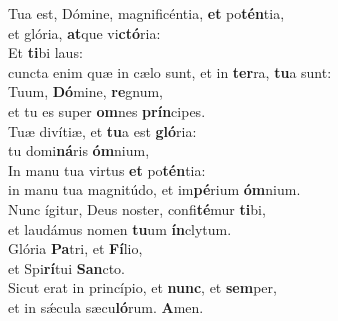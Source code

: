\evenverse Tua est, Dómine, magnificéntia, \textbf{et} po\textbf{tén}tia,~\*\\
\evenverse et glória, \textbf{at}que vi\textbf{ctó}ria:\\
\oddverse Et \textbf{ti}bi laus:~\*\\
\oddverse cuncta enim quæ in cælo sunt, et in \textbf{ter}ra, \textbf{tu}a sunt:\\
\evenverse Tuum, \textbf{Dó}mine, \textbf{re}gnum,~\*\\
\evenverse et tu es super \textbf{om}nes \textbf{prín}cipes.\\
\oddverse Tuæ divítiæ, et \textbf{tu}a est \textbf{gló}ria:~\*\\
\oddverse tu domi\textbf{ná}ris \textbf{óm}nium,\\
\evenverse In manu tua virtus \textbf{et} po\textbf{tén}tia:~\*\\
\evenverse in manu tua magnitúdo, et im\textbf{pé}rium \textbf{óm}nium.\\
\oddverse Nunc ígitur, Deus noster, confi\textbf{té}mur \textbf{ti}bi,~\*\\
\oddverse et laudámus nomen \textbf{tu}um \textbf{ín}clytum.\\
\evenverse Glória \textbf{Pa}tri, et \textbf{Fí}lio,~\*\\
\evenverse et Spi\textbf{rí}tui \textbf{San}cto.\\
\oddverse Sicut erat in princípio, et \textbf{nunc}, et \textbf{sem}per,~\*\\
\oddverse et in sǽcula sæcu\textbf{ló}rum. \textbf{A}men.\\
